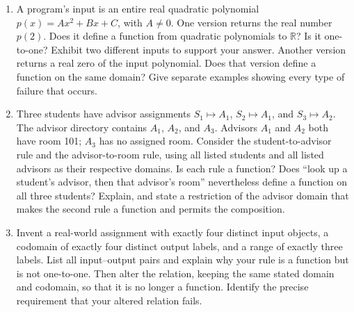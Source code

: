 \documentclass[11pt]{article}
\begin{document}
\begin{enumerate}[leftmargin=*,itemsep=0pt,resume]
  \item A program's input is an entire real quadratic polynomial
  $p(x)=Ax^2+Bx+C$, with $A\ne0$. One version returns the real number $p(2)$.
  Does it define a function from quadratic polynomials to $\mathbb R$?
  Is it one-to-one? Exhibit two different inputs to support your answer.
  Another version returns a real zero of the input polynomial. Does that
  version define a function on the same domain? Give separate examples
  showing every type of failure that occurs.

  \item Three students have advisor assignments
  $S_1\mapsto A_1$, $S_2\mapsto A_1$, and $S_3\mapsto A_2$.
  The advisor directory contains $A_1$, $A_2$, and $A_3$.
  Advisors $A_1$ and $A_2$ both have room 101; $A_3$ has no assigned room.
  Consider the student-to-advisor rule and the advisor-to-room rule, using
  all listed students and all listed advisors as their respective domains.
  Is each rule a function? Does ``look up a student's advisor, then that
  advisor's room'' nevertheless define a function on all three students?
  Explain, and state a restriction of the advisor domain that makes the
  second rule a function and permits the composition.

  \item Invent a real-world assignment with exactly four distinct input
  objects, a codomain of exactly four distinct output labels, and a range
  of exactly three labels. List all input--output pairs and explain why
  your rule is a function but is not one-to-one. Then alter the relation,
  keeping the same stated domain and codomain, so that it is no longer a
  function. Identify the precise requirement that your altered relation fails.
\end{enumerate}
\end{document}
